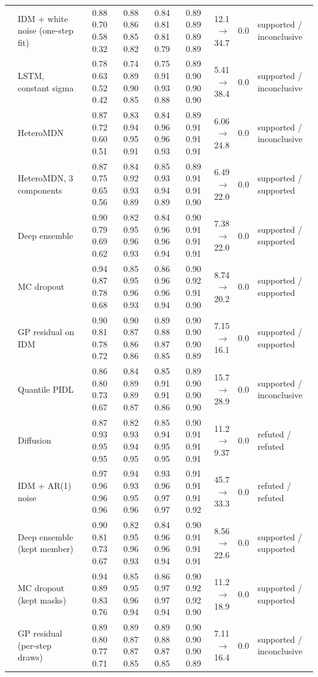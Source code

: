 \begin{longtable}{llrrrrrrl}
 & IDM + white noise (one-step fit) & 0.88 0.70 0.58 0.32 & 0.88 0.86 0.85 0.82 & 0.84 0.81 0.81 0.79 & 0.89 0.89 0.89 0.89 & 12.1 $\rightarrow$ 34.7 & 0.0 & supported / inconclusive \\
 & LSTM, constant sigma & 0.78 0.63 0.52 0.42 & 0.74 0.89 0.90 0.85 & 0.75 0.91 0.93 0.88 & 0.89 0.90 0.90 0.90 & 5.41 $\rightarrow$ 38.4 & 0.0 & supported / inconclusive \\
 & HeteroMDN & 0.87 0.72 0.60 0.51 & 0.83 0.94 0.95 0.91 & 0.84 0.96 0.96 0.93 & 0.89 0.91 0.91 0.91 & 6.06 $\rightarrow$ 24.8 & 0.0 & supported / inconclusive \\
 & HeteroMDN, 3 components & 0.87 0.75 0.65 0.56 & 0.84 0.92 0.93 0.89 & 0.85 0.93 0.94 0.89 & 0.89 0.91 0.91 0.90 & 6.49 $\rightarrow$ 22.0 & 0.0 & supported / supported \\
 & Deep ensemble & 0.90 0.79 0.69 0.62 & 0.82 0.95 0.96 0.93 & 0.84 0.96 0.96 0.94 & 0.90 0.91 0.91 0.91 & 7.38 $\rightarrow$ 22.0 & 0.0 & supported / supported \\
 & MC dropout & 0.94 0.87 0.78 0.68 & 0.85 0.95 0.96 0.93 & 0.86 0.96 0.96 0.94 & 0.90 0.92 0.91 0.90 & 8.74 $\rightarrow$ 20.2 & 0.0 & supported / supported \\
 & GP residual on IDM & 0.90 0.81 0.78 0.72 & 0.90 0.87 0.86 0.86 & 0.89 0.88 0.87 0.85 & 0.90 0.90 0.90 0.89 & 7.15 $\rightarrow$ 16.1 & 0.0 & supported / supported \\
 & Quantile PIDL & 0.86 0.80 0.73 0.67 & 0.84 0.89 0.89 0.87 & 0.85 0.91 0.91 0.86 & 0.89 0.90 0.90 0.90 & 15.7 $\rightarrow$ 28.9 & 0.0 & supported / inconclusive \\
 & Diffusion & 0.87 0.93 0.95 0.95 & 0.82 0.93 0.94 0.95 & 0.85 0.94 0.95 0.95 & 0.90 0.91 0.91 0.91 & 11.2 $\rightarrow$ 9.37 & 0.0 & refuted / refuted \\
 & IDM + AR(1) noise & 0.97 0.96 0.96 0.96 & 0.94 0.93 0.95 0.96 & 0.93 0.96 0.97 0.97 & 0.91 0.91 0.91 0.92 & 45.7 $\rightarrow$ 33.3 & 0.0 & refuted / refuted \\
 & Deep ensemble (kept member) & 0.90 0.81 0.73 0.67 & 0.82 0.95 0.96 0.93 & 0.84 0.96 0.96 0.94 & 0.90 0.91 0.91 0.91 & 8.56 $\rightarrow$ 22.6 & 0.0 & supported / supported \\
 & MC dropout (kept masks) & 0.94 0.89 0.83 0.76 & 0.85 0.95 0.96 0.94 & 0.86 0.97 0.97 0.94 & 0.90 0.92 0.92 0.90 & 11.2 $\rightarrow$ 18.9 & 0.0 & supported / supported \\
 & GP residual (per-step draws) & 0.89 0.80 0.77 0.71 & 0.89 0.87 0.87 0.85 & 0.89 0.88 0.87 0.85 & 0.90 0.90 0.90 0.89 & 7.11 $\rightarrow$ 16.4 & 0.0 & supported / inconclusive \\
\end{longtable}
\endgroup
